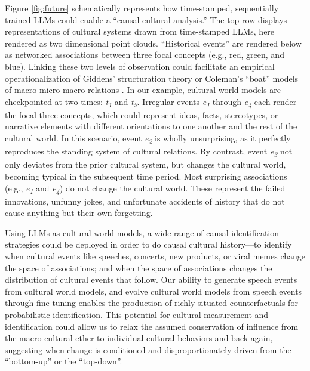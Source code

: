 \documentclass{article} %
\begin{document}
Figure \ref{fig:future} schematically represents how time-stamped, sequentially
trained LLMs could enable a ``causal cultural analysis.'' The top row
displays representations of cultural systems drawn from time-stamped
LLMs, here rendered as two dimensional point clouds. ``Historical
events'' are rendered below as networked associations between three
focal concepts (e.g., red, green, and blue). Linking these two levels of
observation could facilitate an empirical operationalization of Giddens'
structuration theory \parencite{Giddens1984-vx} or Coleman's ``boat'' models of macro-micro-macro relations
\parencite{Coleman1994-ay}. In our
example, cultural world models are checkpointed at two times:
\emph{t\textsubscript{1}} and \emph{t\textsubscript{2}}. Irregular
events \emph{e\textsubscript{1}} through \emph{e\textsubscript{4}} each
render the focal three concepts, which could represent ideas, facts,
stereotypes, or narrative elements with different orientations to one
another and the rest of the cultural world. In this scenario, event
\emph{e\textsubscript{2}} is wholly unsurprising, as it perfectly
reproduces the standing system of cultural relations. By contrast, event
\emph{e\textsubscript{3 }}not only deviates from the prior cultural
system, but changes the cultural world, becoming typical in the
subsequent time period. Most surprising associations (e.g.,
\emph{e\textsubscript{1}} and \emph{e\textsubscript{4}}) do not change
the cultural world. These represent the failed innovations, unfunny
jokes, and unfortunate accidents of history that do not cause anything
but their own forgetting.

Using LLMs as cultural world models, a wide range of causal
identification strategies
\parencite{Pearl2009-on} could be
deployed in order to do causal cultural history---to identify when
cultural events like speeches, concerts, new products, or viral memes
change the space of associations; and when the space of associations
changes the distribution of cultural events that follow. Our ability to
generate speech events from cultural world models, and evolve cultural
world models from speech events through fine-tuning enables the
production of richly situated counterfactuals for probabilistic
identification. This potential for cultural measurement and
identification could allow us to relax the assumed conservation of
influence from the macro-cultural ether to individual cultural behaviors
and back again, suggesting when change is conditioned and
disproportionately driven from the ``bottom-up'' or the ``top-down''.
\end{document}
